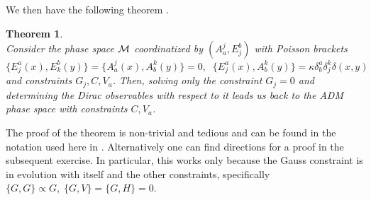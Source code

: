 \documentclass[12pt]{report}
\newtheorem{Theorem}{Theorem}[section]
\def\be{\begin{equation}}
\def\ee{\end{equation}}
\begin{document}
We then have the following theorem \cite{22}.
%
\begin{Theorem} \label{th1.2.0}
~~~\\
Consider the phase space $\cal M$ coordinatized by $(A_a^j,E^b_j)$
with Poisson brackets
\be \label{1.2.17}
\{E^a_j(x),E^b_k(y)\}=
\{A_a^j(x),A_b^k(y)\}=0,\;\;
\{E^a_j(x),A_b^k(y)\}=\kappa\delta^a_b\delta_j^k\delta(x,y)
\ee
and constraints $G_j,C,V_a$. Then, solving only the constraint $G_j=0$ and 
determining the Dirac observables with respect to it leads us back
to the ADM phase space with constraints $C,V_a$.
\end{Theorem}
%
The proof of the theorem is non-trivial and tedious and can be found 
in the notation used here in \cite{0}. Alternatively one can find 
directions for a proof in the subsequent exercise. In 
particular, this works only 
because the Gauss constraint is in evolution with itself and the other 
constraints, specifically $\{G,G\}\propto G,\;\{G,V\}=\{G,H\}=0$.
%
\end{document}

